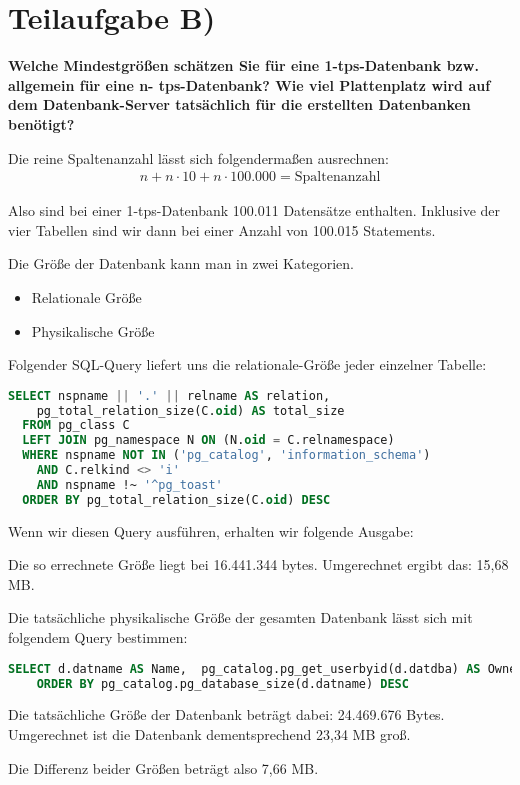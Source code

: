 \section{Teilaufgabe B)}
\textbf{Welche Mindestgrößen schätzen Sie für eine 1-tps-Datenbank bzw. allgemein für eine n-
tps-Datenbank? Wie viel Plattenplatz wird auf dem Datenbank-Server tatsächlich für die
erstellten Datenbanken benötigt?}

Die reine Spaltenanzahl lässt sich folgendermaßen ausrechnen:
\begin{eqnarray}
n + n \cdot 10 + n \cdot 100.000 = \mbox{Spaltenanzahl}
\end{eqnarray}

Also sind bei einer 1-tps-Datenbank 100.011 Datensätze enthalten. Inklusive der
vier Tabellen sind wir dann bei einer Anzahl von 100.015 Statements.

Die Größe der Datenbank kann man in zwei Kategorien.
\begin{itemize}
  \item Relationale Größe
  \item Physikalische Größe
\end{itemize}

Folgender SQL-Query liefert uns die relationale-Größe jeder einzelner Tabelle:
\begin{lstlisting}[language=sql, caption={Größe der Tabelle und Datensätze
ermitteln}]
  SELECT nspname || '.' || relname AS relation,
    pg_total_relation_size(C.oid) AS total_size
  FROM pg_class C
  LEFT JOIN pg_namespace N ON (N.oid = C.relnamespace)
  WHERE nspname NOT IN ('pg_catalog', 'information_schema')
    AND C.relkind <> 'i'
    AND nspname !~ '^pg_toast'
  ORDER BY pg_total_relation_size(C.oid) DESC
\end{lstlisting}

Wenn wir diesen Query ausführen, erhalten wir folgende Ausgabe:

Die so errechnete Größe liegt bei 16.441.344 bytes. Umgerechnet ergibt das: 
15,68 MB.

Die tatsächliche physikalische Größe der gesamten Datenbank lässt sich mit
folgendem Query bestimmen:
\begin{lstlisting}[language=sql, caption={Physikalische Größe der Datenbank
ermitteln}]
SELECT d.datname AS Name,  pg_catalog.pg_get_userbyid(d.datdba) AS Owner, pg_catalog.pg_database_size(d.datname) AS SIZE FROM pg_catalog.pg_database d
    ORDER BY pg_catalog.pg_database_size(d.datname) DESC
\end{lstlisting}

Die tatsächliche Größe der Datenbank beträgt dabei: 24.469.676 Bytes.
Umgerechnet ist die Datenbank dementsprechend 23,34 MB groß.

Die Differenz beider Größen beträgt also 7,66 MB.
\clearpage